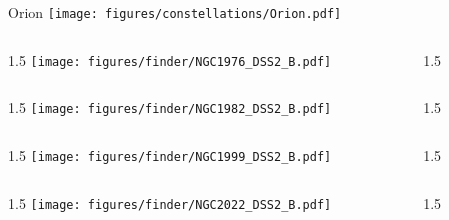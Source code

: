 \documentclass[final]{beamer}
\newlength{\colwidth}
\begin{document}

\begin{frame}[t]{\LARGE Orion}
  \centering
  \texttt{[image: figures/constellations/Orion.pdf]}
\end{frame}


\begin{frame}[t]{}
  \begin{columns}[T]
    \begin{column}{1.5\colwidth}
      \centering
      \texttt{[image: figures/finder/NGC1976\_DSS2\_B.pdf]}
    \end{column}
    \begin{column}{1.5\colwidth}
      \Large
      
    \end{column}
  \end{columns}
  \vspace{\fill}
  \begin{columns}[T]
    \begin{column}{1.5\colwidth}
      \centering
      \texttt{[image: figures/finder/NGC1982\_DSS2\_B.pdf]}
    \end{column}
    \begin{column}{1.5\colwidth}
      \Large
      
    \end{column}
  \end{columns}
\end{frame}


\begin{frame}[t]{}
  \begin{columns}[T]
    \begin{column}{1.5\colwidth}
      \centering
      \texttt{[image: figures/finder/NGC1999\_DSS2\_B.pdf]}
    \end{column}
    \begin{column}{1.5\colwidth}
      \Large
      
    \end{column}
  \end{columns}
  \vspace{\fill}
  \begin{columns}[T]
    \begin{column}{1.5\colwidth}
      \centering
      \texttt{[image: figures/finder/NGC2022\_DSS2\_B.pdf]}
    \end{column}
    \begin{column}{1.5\colwidth}
      \Large
      
    \end{column}
  \end{columns}
\end{frame}
\end{document}
